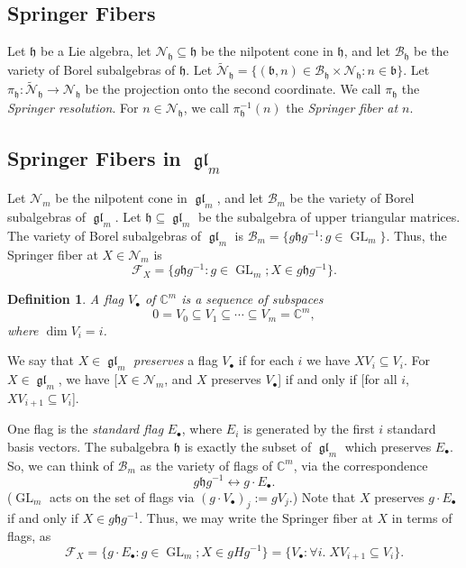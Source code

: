 \documentclass[12pt,psamsfonts]{article}
\DeclareMathOperator{\GL}{GL}
\DeclareMathOperator{\gl}{\mathfrak{gl}}
\newtheorem{definition}[theorem]{Definition}
\begin{document}
\subsection{Springer Fibers}
Let \(\mathfrak{h}\) be a Lie algebra, let \(\mathcal{N}_\mathfrak{h} \subseteq \mathfrak{h}\) be the nilpotent cone in \(\mathfrak{h}\), and let \(\mathcal{B}_\mathfrak{h}\) be the variety of Borel subalgebras of \(\mathfrak{h}\).
Let \(\widetilde{\mathcal{N}}_\mathfrak{h} = \{(\mathfrak{b}, n) \in \mathcal{B}_\mathfrak{h} \times \mathcal{N}_\mathfrak{h} : n \in \mathfrak{b}\}\).
Let \(\pi_\mathfrak{h} : \widetilde{\mathcal{N}}_\mathfrak{h} \to \mathcal{N}_\mathfrak{h}\) be the projection onto the second coordinate.
We call \(\pi_\mathfrak{h}\) the \emph{Springer resolution}.
For \(n \in \mathcal{N}_\mathfrak{h}\), we call \(\pi_\mathfrak{h}^{-1}(n)\) the \emph{Springer fiber at \(n\)}.

\subsection{Springer Fibers in \texorpdfstring{\(\gl_m\)}{gl\_m}}
Let \(\mathcal{N}_m\) be the nilpotent cone in \(\gl_m\), and let \(\mathcal{B}_m\) be the variety of Borel subalgebras of \(\gl_m\).
Let \(\mathfrak{h} \subseteq \gl_m\) be the subalgebra of upper triangular matrices.
The variety of Borel subalgebras of \(\gl_m\) is \(\mathcal{B}_m = \{g\mathfrak{h}g^{-1} : g \in \GL_m\}\).
Thus, the Springer fiber at \(X \in \mathcal{N}_m\) is 
\[\mathcal{F}_X = \{g\mathfrak{h}g^{-1} : g \in \GL_m; X \in g\mathfrak{h}g^{-1}\}.\]
\begin{definition}
    A \emph{flag} \(V_\bullet\) of \(\mathbb{C}^m\) is a sequence of subspaces
    \[0 = V_0 \subseteq V_1 \subseteq \cdots \subseteq V_m = \mathbb{C}^m,\]
    where \(\dim V_i = i\).
\end{definition}
We say that \(X \in \gl_m\) \emph{preserves} a flag \(V_\bullet\) if for each \(i\) we have \(XV_i \subseteq V_i\).
For \(X \in \gl_m\), we have [\(X \in \mathcal{N}_m\), and \(X\) preserves \(V_\bullet\)] if and only if [for all \(i\), \(XV_{i + 1} \subseteq V_i\)].
\par One flag is the \emph{standard flag} \(E_\bullet\), where \(E_i\) is generated by the first \(i\) standard basis vectors.
The subalgebra \(\mathfrak{h}\) is exactly the subset of \(\gl_m\) which preserves \(E_\bullet\).
So, we can think of \(\mathcal{B}_m\) as the variety of flags of \(\mathbb{C}^m\), via the correspondence 
\[g\mathfrak{h}g^{-1} \leftrightarrow g \cdot E_\bullet.\]
(\(\GL_m\) acts on the set of flags via \((g \cdot V_\bullet)_j := gV_j\).)
Note that \(X\) preserves \(g \cdot E_\bullet\) if and only if \(X \in g \mathfrak{h} g^{-1}\).
Thus, we may write the Springer fiber at \(X\) in terms of flags, as 
\[\mathcal{F}_X = \{g \cdot E_\bullet : g \in \GL_m; X \in gHg^{-1}\} = \{V_\bullet : \forall i. \; XV_{i + 1} \subseteq V_i\}.\]
\end{document}

